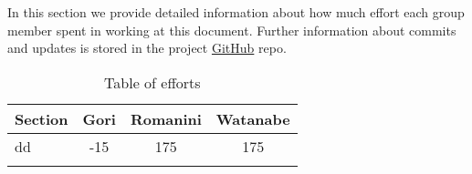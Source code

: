 In this section we provide detailed information about how much effort each group member spent in working at this document. Further information about commits and updates is stored in the project \href{https://github.com/MarcoRomanini/GoriRomaniniWatanabe}{GitHub} repo.



\begin{center}
    \setlength\arrayrulewidth{1pt}
    \begin{longtable}{lccc}
        
        \hline
        \rowcolor{myblue}\color{white}Section & \color{white}Gori & \color{white}Romanini & \color{white}Watanabe \\
        \hline
        dd &	-15	&	175	&	175	\\
        \hline
        
        \rowcolor{white}\caption{\label{tab:effort}Table of efforts}
        
    \end{longtable}
\end{center}
